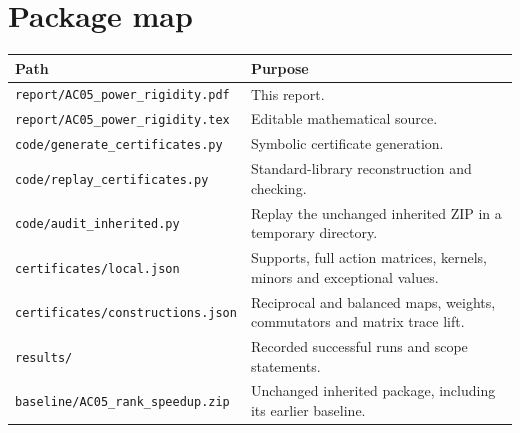 \documentclass[11pt]{article}
\theoremstyle{remark}\newtheorem{remark}[theorem]{Remark}
\begin{document}
\section{Package map}
\begin{center}\small
\begin{tabular}{>{\raggedright\arraybackslash}p{}>{\raggedright\arraybackslash}p{}}
\toprule
Path & Purpose\\
\midrule
\texttt{report/AC05\_power\_rigidity.pdf} & This report.\\
\texttt{report/AC05\_power\_rigidity.tex} & Editable mathematical source.\\
\texttt{code/generate\_certificates.py} & Symbolic certificate generation.\\
\texttt{code/replay\_certificates.py} & Standard-library reconstruction and checking.\\
\texttt{code/audit\_inherited.py} & Replay the unchanged inherited ZIP in a temporary directory.\\
\texttt{certificates/local.json} & Supports, full action matrices, kernels, minors and exceptional values.\\
\texttt{certificates/constructions.json} & Reciprocal and balanced maps, weights, commutators and matrix trace lift.\\
\texttt{results/} & Recorded successful runs and scope statements.\\
\texttt{baseline/AC05\_rank\_speedup.zip} & Unchanged inherited package, including its earlier baseline.\\
\bottomrule
\end{tabular}
\end{center}
\end{document}
